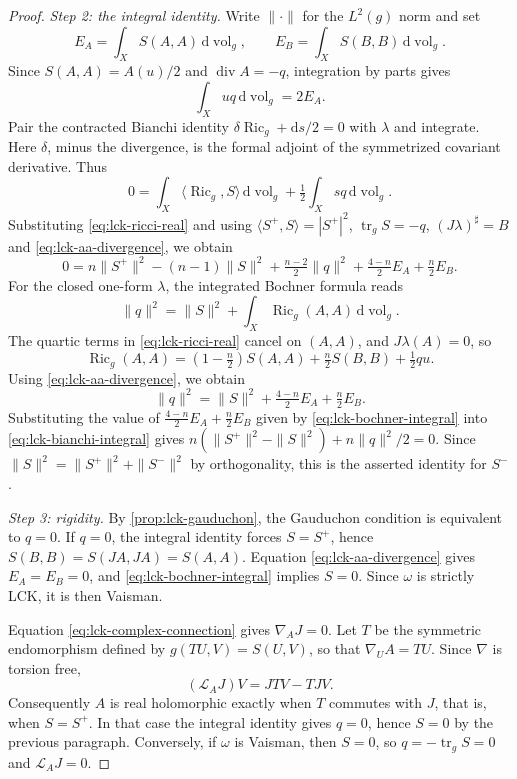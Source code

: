 \begin{proof}
\emph{Step 2: the integral identity.} Write $\|\cdot\|$ for the $L^2(g)$ norm and set
\[
 E_A=\int_X S(A,A)\,\mathrm d\operatorname{vol}_g,
 \qquad E_B=\int_X S(B,B)\,\mathrm d\operatorname{vol}_g.
\]
Since $S(A,A)=A(u)/2$ and $\operatorname{div}A=-q$, integration by parts gives
\begin{equation}\label{eq:lck-aa-divergence}
 \int_Xu q\,\mathrm d\operatorname{vol}_g=2E_A.
\end{equation}
Pair the contracted Bianchi identity $\delta\operatorname{Ric}_g+\mathrm ds/2=0$ with $\lambda$ and integrate. Here $\delta$, minus the divergence, is the formal adjoint of the symmetrized covariant derivative. Thus
\[
 0=\int_X\langle\operatorname{Ric}_g,S\rangle\,\mathrm d\operatorname{vol}_g
       +\tfrac12\int_Xs q\,\mathrm d\operatorname{vol}_g.
\]
Substituting \eqref{eq:lck-ricci-real} and using $\langle S^+,S\rangle=|S^+|^2$, $\operatorname{tr}_gS=-q$, $(J\lambda)^\sharp=B$ and \eqref{eq:lck-aa-divergence}, we obtain
\begin{equation}\label{eq:lck-bianchi-integral}
 0=n\|S^+\|^2-(n-1)\|S\|^2+\tfrac{n-2}{2}\|q\|^2
       +\tfrac{4-n}{2}E_A+\tfrac n2E_B.
\end{equation}
For the closed one-form $\lambda$, the integrated Bochner formula reads
\[
 \|q\|^2=\|S\|^2
          +\int_X\operatorname{Ric}_g(A,A)\,\mathrm d\operatorname{vol}_g.
\]
The quartic terms in \eqref{eq:lck-ricci-real} cancel on $(A,A)$, and $J\lambda(A)=0$, so
\[
 \operatorname{Ric}_g(A,A)
 =(1-\tfrac n2)S(A,A)+\tfrac n2 S(B,B)+\tfrac12q u.
\]
Using \eqref{eq:lck-aa-divergence}, we obtain
\begin{equation}\label{eq:lck-bochner-integral}
 \|q\|^2=\|S\|^2+\tfrac{4-n}{2}E_A+\tfrac n2E_B.
\end{equation}
Substituting the value of $\tfrac{4-n}{2}E_A+\tfrac n2E_B$ given by \eqref{eq:lck-bochner-integral} into \eqref{eq:lck-bianchi-integral} gives
$n(\|S^+\|^2-\|S\|^2)+n\|q\|^2/2=0$. Since $\|S\|^2=\|S^+\|^2+\|S^-\|^2$ by orthogonality, this is the asserted identity for $S^-$.

\emph{Step 3: rigidity.} By \cref{prop:lck-gauduchon}, the Gauduchon condition is equivalent to $q=0$. If $q=0$, the integral identity forces $S=S^+$, hence $S(B,B)=S(JA,JA)=S(A,A)$. Equation \eqref{eq:lck-aa-divergence} gives $E_A=E_B=0$, and \eqref{eq:lck-bochner-integral} implies $S=0$. Since $\omega$ is strictly LCK, it is then Vaisman.

Equation \eqref{eq:lck-complex-connection} gives $\nabla_AJ=0$. Let $T$ be the symmetric endomorphism defined by $g(TU,V)=S(U,V)$, so that $\nabla_UA=TU$. Since $\nabla$ is torsion free,
\[
 (\mathcal L_AJ)V=JTV-TJV.
\]
Consequently $A$ is real holomorphic exactly when $T$ commutes with $J$, that is, when $S=S^+$. In that case the integral identity gives $q=0$, hence $S=0$ by the previous paragraph. Conversely, if $\omega$ is Vaisman, then $S=0$, so $q=-\operatorname{tr}_gS=0$ and $\mathcal L_AJ=0$.
\end{proof}
